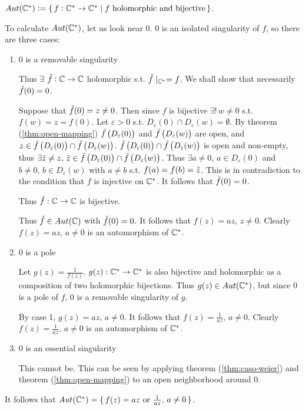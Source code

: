 \begin{example}[$Aut(\C^*)$]\label{ex:aut-C-star}

$Aut(\mathbb{C}^*) \vcentcolon = \set{f:\mathbb{C}^* \to \mathbb{C}^* \mid f \text{ holomorphic and bijective} }$.

To calculate $Aut(\C^*)$, let us look near $0$. $0$ is an isolated singularity of $f$, so there are three cases:
\begin{enumerate}
    \item $0$ is a removable singularity
    
    Thus $\exists$ $\Tilde{f}: \mathbb{C} \to \mathbb{C}$ holomorphic s.t. $\Tilde{f} \mid_{\mathbb{C}^*} = f$. We shall show that necessarily $\Tilde{f} (0) =0$.
    
    Suppose that $\Tilde{f} (0) = z \neq 0$. Then since $f$ is bijective $\exists ! \, w \neq 0$ s.t. $f(w) = z = f(0)$. Let $\varepsilon >0$ s.t. $D_\varepsilon(0) \cap D_\varepsilon(w) = \emptyset$. By theorem (\ref{thm:open-mapping}) $\Tilde{f} \left( D_\varepsilon(0) \right) $ and $\Tilde{f} \left( D_\varepsilon(w) \right) $ are open, and $z \in \Tilde{f} \left( D_\varepsilon(0) \right) \cap \Tilde{f} \left( D_\varepsilon(w) \right) $. $\Tilde{f} \left( D_\varepsilon(0) \right) \cap \Tilde{f} \left( D_\varepsilon(w) \right) $ is open and non-empty, thus $\exists \Tilde{z} \neq z, \, \Tilde{z} \in \Tilde{f} \left( D_\varepsilon(0) \right) \cap \Tilde{f} \left( D_\varepsilon(w) \right) $. Thus $\exists a \neq 0, \, a \in D_\varepsilon (0)$ and $b \neq 0, \, b \in D_\varepsilon (w)$ with $a \neq b$ s.t. $f(a) = f(b) = \Tilde{z}$. This is in contradiction to the condition that $f$ is injective on $\mathbb{C} ^*$. It follows that $\Tilde{f}(0) = 0$.
    
    Thus $\Tilde{f}: \mathbb{C} \to \mathbb{C}$ is bijective.
    
    Thus $\Tilde{f} \in Aut(\mathbb{C})$ with $\Tilde{f} (0) = 0$. It follows that $f(z) = az, \, z \neq 0$. Clearly $f(z) = az, \, a \neq 0$ is an automorphism of $\mathbb{C}^*$.
    
    \item $0$ is a pole
    
    Let $g(z) = \frac{1}{f(z)}$. $g(z):\mathbb{C}^* \to \mathbb{C}^* $ is also bijective and holomorphic as a composition of two holomorphic bijections. Thus $g(z) \in Aut(\mathbb{C}^*)$, but since $0$ is a pole of $f$, $0$ is a removable singularity of $g$.
    
    By case 1, $g(z) = az, \, a \neq 0$. It follows that $f(z) = \frac{1}{az}, \, a \neq 0$. Clearly \\ $f(z) = \frac{1}{az}, \, a \neq 0$ is an automorphism of $\mathbb{C} ^*$.
    
    \item $0$ is an essential singularity
    
    This cannot be. This can be seen by applying theorem (\ref{thm:caso-weier}) and theorem (\ref{thm:open-mapping}) to an open neighborhood around $0$.
    
\end{enumerate}

It follows that $Aut(\mathbb{C}^*) = \set{ f(z) = az \text{ or } \frac{1}{az}, \, a \neq 0}$.


\end{example}


